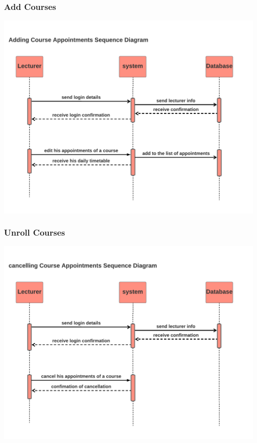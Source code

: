 \documentclass[../Psychological_system_web_application.tex]{subfiles}
\begin{document}
							
							
						\subsubsection{Add Courses}
							
								\includegraphics[width=\textwidth ,height=0.4\textheight ,scale=4]{Diagrams/sequence_diagram/Adding_course_lecturer.pdf}
								\label{FIG:2.11}
							
							
							
						\subsubsection{Unroll Courses}
							
								\includegraphics[width=\textwidth ,height=0.4\textheight ,scale=4]{Diagrams/sequence_diagram/cancel_course_lecturer.pdf}
								\label{FIG:2.12}
							
\end{document}
